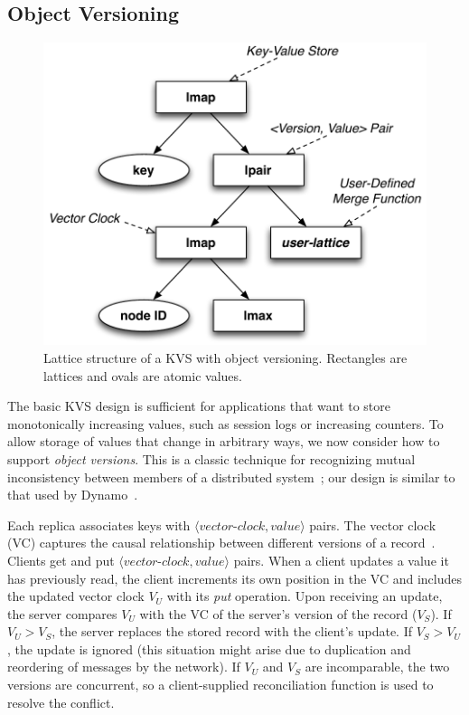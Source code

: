 \subsection{Object Versioning}
\label{sec:kvs-versions}
\begin{figure}[t]
\centering
\includegraphics[width=0.8\linewidth]{fig/kvs-vc-lattice.pdf}
\caption{Lattice structure of a KVS with object versioning. Rectangles are
  lattices and ovals are atomic values.}
\label{fig:kvs-vc-lattices}
\end{figure}

The basic KVS design is sufficient for applications that want to store
monotonically increasing values, such as session logs or increasing counters. To
allow storage of values that change in arbitrary ways, we now consider how to
support \emph{object versions}. This is a classic technique for recognizing
mutual inconsistency between members of a distributed system~\cite{Parker1983};
our design is similar to that used by Dynamo~\cite{DeCandia2007}.

Each replica associates keys with
$\langle\textit{vector-clock},\textit{value}\rangle$ pairs. The vector clock
(VC) captures the causal relationship between different versions of a
record~\cite{Fidge1988,DeCandia2007}. Clients get and put
$\langle\textit{vector-clock},\textit{value}\rangle$ pairs. When a client
updates a value it has previously read, the client increments its own position
in the VC and includes the updated vector clock $V_U$ with its \emph{put}
operation. Upon receiving an update, the server compares $V_U$ with the VC of
the server's version of the record ($V_S$). If $V_U > V_S$, the server replaces
the stored record with the client's update. If $V_S > V_U$, the update is
ignored (this situation might arise due to duplication and reordering of
messages by the network). If $V_U$ and $V_S$ are incomparable, the two versions
are concurrent, so a client-supplied reconciliation function is used to resolve
the conflict.

